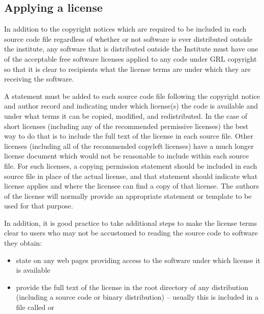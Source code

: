 \documentclass[10pt,a4paper]{article}
\begin{document}
\subsection{Applying a license}

\par In addition to the copyright notices which are required to be included in each 
source code file regardless of whether or not software is ever distributed outside 
the institute, any software that is distributed outside the Institute must have 
one of the acceptable free software licenses applied to any code under GRL 
copyright so that it is clear to recipients what the license terms are under which 
they are receiving the software. 

\par A statement must be added to each source code file following the copyright 
notice and author record and indicating under which license(s) the code is 
available and under what terms it can be copied, modified, and redistributed. 
In the case of short licenses (including any of the recommended permissive 
licenses) the best way to do that is to include the full text of the license in each 
source file. Other licenses (including all of the recommended copyleft licenses) 
have a much longer license document which would not be reasonable to include 
within each source file. For such licenses, a copying permission statement should 
be included in each source file in place of the actual license, and that statement 
should indicate what license applies and where the licensee can find a copy of 
that license. The authors of the license will normally provide an appropriate 
statement or template to be used for that purpose.

\par In addition, it is good practice to take additional steps to make the license 
terms clear to users who may not be accustomed to reading the source code 
to software they obtain: 
\begin{itemize}
\item state on any web pages providing access to the software under which 
license it is available

\item provide the full text of the license in the root directory of any distribution 
(including a source code or binary distribution) -- usually this is included in a file 
called  or 

\end{itemize}
\end{document}
